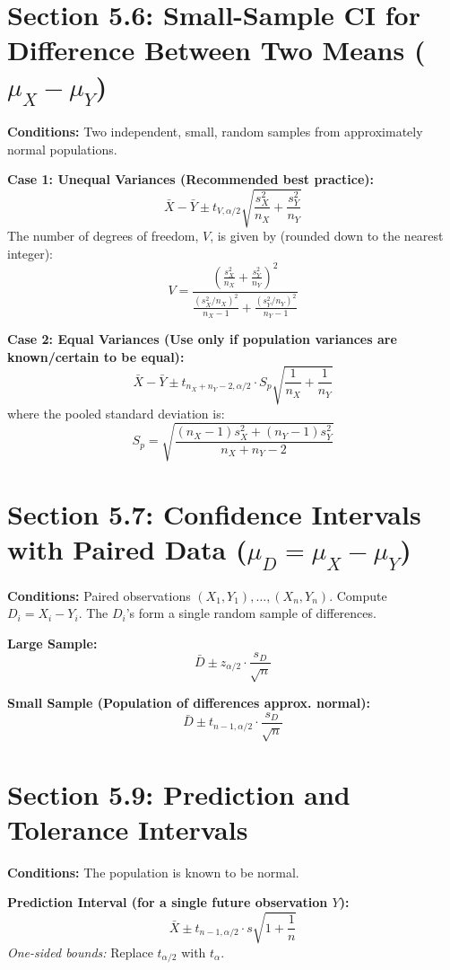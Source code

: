 \documentclass[11pt]{article}
\begin{document}
\section*{Section 5.6: Small-Sample CI for Difference Between Two Means ($\mu_X - \mu_Y$)}
\textbf{Conditions:} Two independent, small, random samples from approximately normal populations.

\textbf{Case 1: Unequal Variances (Recommended best practice):}
\[\bar{X} - \bar{Y} \pm t_{V, \alpha/2} \sqrt{\frac{s_X^2}{n_X} + \frac{s_Y^2}{n_Y}}\]
The number of degrees of freedom, $V$, is given by (rounded down to the nearest integer):
\[V = \frac{\left( \frac{s_X^2}{n_X} + \frac{s_Y^2}{n_Y} \right)^2}{\frac{(s_X^2 / n_X)^2}{n_X - 1} + \frac{(s_Y^2 / n_Y)^2}{n_Y - 1}}\]

\textbf{Case 2: Equal Variances (Use only if population variances are known/certain to be equal):}
\[\bar{X} - \bar{Y} \pm t_{n_X + n_Y - 2, \alpha/2} \cdot S_p \sqrt{\frac{1}{n_X} + \frac{1}{n_Y}}\]
where the pooled standard deviation is:
\[S_p = \sqrt{ \frac{(n_X - 1)s_X^2 + (n_Y - 1)s_Y^2}{n_X + n_Y - 2} }\]

\section*{Section 5.7: Confidence Intervals with Paired Data ($\mu_D = \mu_X - \mu_Y$)}
\textbf{Conditions:} Paired observations $(X_1, Y_1), \dots, (X_n, Y_n)$. Compute $D_i = X_i - Y_i$. The $D_i$'s form a single random sample of differences.

\textbf{Large Sample:}
\[\bar{D} \pm z_{\alpha/2} \cdot \frac{s_D}{\sqrt{n}}\]

\textbf{Small Sample (Population of differences approx. normal):}
\[\bar{D} \pm t_{n-1, \alpha/2} \cdot \frac{s_D}{\sqrt{n}}\]

\section*{Section 5.9: Prediction and Tolerance Intervals}
\textbf{Conditions:} The population is known to be normal.

\textbf{Prediction Interval (for a single future observation $Y$):}
\[\bar{X} \pm t_{n-1, \alpha/2} \cdot s \sqrt{1 + \frac{1}{n}}\]
\textit{One-sided bounds:} Replace $t_{\alpha/2}$ with $t_\alpha$.
\end{document}
